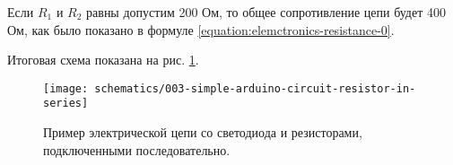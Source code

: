 \documentclass[../sparc.tex]{subfiles}
\begin{document}
Если $R_1$ и $R_2$ равны допустим 200 Ом, то общее сопротивление цепи будет 400
Ом, как было показано в формуле \ref{equation:elemctronics-resistance-0}.

Итоговая схема показана на рис.
\ref{fig:breadboard-simple-arduino-circuit-resistor-in-series}.

\begin{figure}[ht]
  \centering
  \caption{Пример электрической цепи со светодиода и резисторами, подключенными
    последовательно.}
  \texttt{[image: schematics/003-simple-arduino-circuit-resistor-in-series]}
  \label{fig:breadboard-simple-arduino-circuit-resistor-in-series}
\end{figure}
\end{document}
